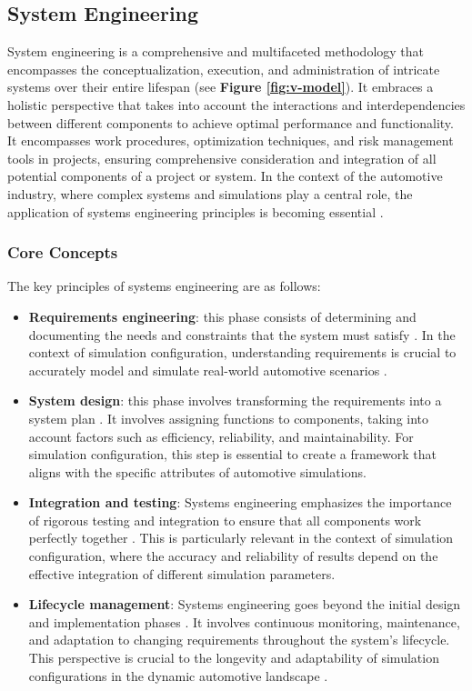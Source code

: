 \subsection{System Engineering \label{sec:sysen}}
System engineering is a comprehensive and multifaceted methodology that encompasses the conceptualization, execution, and administration of intricate systems over their entire lifespan \cite{haberfellner2019systems} (see \textbf{Figure \ref{fig:v-model}}). It embraces a holistic perspective that takes into account the interactions and interdependencies between different components to achieve optimal performance and functionality. It encompasses work procedures, optimization techniques, and risk management tools in projects, ensuring comprehensive consideration and integration of all potential components of a project or system. In the context of the automotive industry, where complex systems and simulations play a central role, the application of systems engineering principles is becoming essential \cite{d2017systems}.

\subsubsection{Core Concepts}
    The key principles of systems engineering are as follows:
    \begin{itemize}
      \item \textbf{Requirements engineering}: this phase consists of determining and documenting the needs and constraints that the system must satisfy \cite{loper2015modeling}. In the context of simulation configuration, understanding requirements is crucial to accurately model and simulate real-world automotive scenarios \cite{keating2008system}.
      
      \item \textbf{System design}: this phase involves transforming the requirements into a system plan \cite{loper2015modeling, nielsen2015systems}. It involves assigning functions to components, taking into account factors such as efficiency, reliability, and maintainability. For simulation configuration, this step is essential to create a framework that aligns with the specific attributes of automotive simulations.
      
      \item \textbf{Integration and testing}: Systems engineering emphasizes the importance of rigorous testing and integration to ensure that all components work perfectly together \cite{loper2015modeling}. This is particularly relevant in the context of simulation configuration, where the accuracy and reliability of results depend on the effective integration of different simulation parameters.
      
      \item \textbf{Lifecycle management}: Systems engineering goes beyond the initial design and implementation phases \cite{loper2015modeling}. It involves continuous monitoring, maintenance, and adaptation to changing requirements throughout the system's lifecycle. This perspective is crucial to the longevity and adaptability of simulation configurations in the dynamic automotive landscape \cite{nielsen2015systems}.
    \end{itemize}

